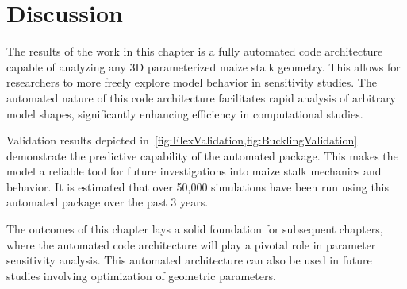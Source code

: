 \section{Discussion}
\label{sec:automation_discussion}
The results of the work in this chapter is a fully automated code architecture capable of analyzing any 3D parameterized maize stalk geometry. This allows for researchers to more freely explore model behavior in sensitivity studies. The automated nature of this code architecture facilitates rapid analysis of arbitrary model shapes, significantly enhancing efficiency in computational studies.

Validation results depicted in~\cref{fig:FlexValidation,fig:BucklingValidation} demonstrate the predictive capability of the automated package.  This makes the model a reliable tool for future investigations into maize stalk mechanics and behavior. It is estimated that over 50,000 simulations have been run using this automated package over the past 3 years.

The outcomes of this chapter lays a solid foundation for subsequent chapters, where the automated code architecture will play a pivotal role in parameter sensitivity analysis. This automated architecture can also be used in future studies involving optimization of geometric parameters. 

